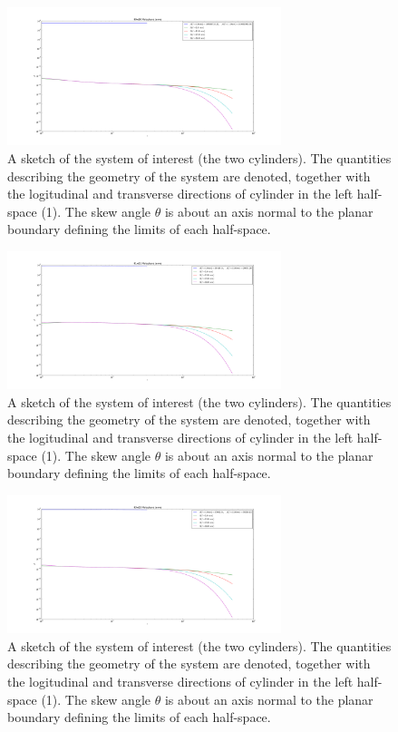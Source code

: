 \documentclass[onecolumn,letterpaper,amsmath,amssymb,floatfix,aps,superscriptaddress]{revtex4}
\begin{document}
\begin{figure}
\centerline{\includegraphics[width=8cm]{par_plots/90w90_A_vs_n.pdf}}%
\caption{A sketch of the system of interest (the two cylinders). The quantities describing the geometry of the system are 
denoted, together with the logitudinal and transverse directions of cylinder in the left half-space (1). The skew angle $\theta$ is about an axis normal to the planar boundary defining the limits of each half-space.
}
\label{fig:sketch}
\end{figure}

\begin{figure}
\centerline{\includegraphics[width=8cm]{par_plots/91w91_A_vs_n.pdf}}%
\caption{A sketch of the system of interest (the two cylinders). The quantities describing the geometry of the system are 
denoted, together with the logitudinal and transverse directions of cylinder in the left half-space (1). The skew angle $\theta$ is about an axis normal to the planar boundary defining the limits of each half-space.
}
\label{fig:sketch}
\end{figure}

\begin{figure}
\centerline{\includegraphics[width=8cm]{par_plots/93w93_A_vs_n.pdf}}%
\caption{A sketch of the system of interest (the two cylinders). The quantities describing the geometry of the system are 
denoted, together with the logitudinal and transverse directions of cylinder in the left half-space (1). The skew angle $\theta$ is about an axis normal to the planar boundary defining the limits of each half-space.
}
\label{fig:sketch}
\end{figure}
\end{document}
